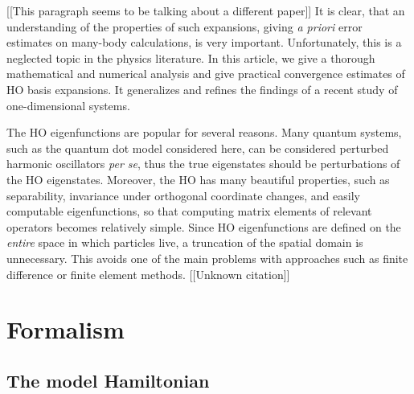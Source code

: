 [[This paragraph seems to be talking about a different paper]]
It is clear, that an understanding of the properties of such expansions,
giving \emph{a priori} error estimates on many-body calculations, is very
important. Unfortunately, this is a neglected topic in the physics
literature. In this article, we give a thorough mathematical and numerical
analysis and give practical convergence estimates of HO basis expansions. It
generalizes and refines the findings of a recent study of one-dimensional
systems.\cite{Kvaal2007}

The HO eigenfunctions are popular for several reasons. Many quantum systems, such as the quantum dot model considered here, can be considered perturbed harmonic oscillators \textit{per se}, thus the true eigenstates should be perturbations of the HO eigenstates.  Moreover, the HO has many beautiful properties, such as separability, invariance under orthogonal coordinate changes, and easily computable eigenfunctions, so that computing matrix elements of relevant operators becomes relatively simple.  Since HO eigenfunctions are defined on the \emph{entire} space in which particles live, a truncation of the spatial domain is unnecessary.  This avoids one of the main problems with approaches such as finite difference or finite element methods.\cite{ram2002finite} [[Unknown citation]]

\section{Formalism}
\label{sec:formalism}

\subsection{The model Hamiltonian}
\label{subsec:modelHamiltonian}

